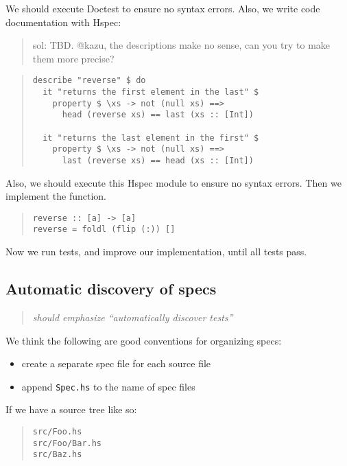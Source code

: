 \documentclass[preprint]{sigplanconf}
\begin{document}
\noindent We should execute Doctest to ensure no syntax errors.
Also, we write code documentation with Hspec:

\begin{quote}
    sol: TBD. @kazu, the descriptions make no sense, can you try to
    make them more precise?
\end{quote}

\begin{quote}
\small
\begin{verbatim}
describe "reverse" $ do
  it "returns the first element in the last" $
    property $ \xs -> not (null xs) ==>
      head (reverse xs) == last (xs :: [Int])

  it "returns the last element in the first" $
    property $ \xs -> not (null xs) ==>
      last (reverse xs) == head (xs :: [Int])
\end{verbatim}
\end{quote}

\noindent Also, we should execute this Hspec module
to ensure no syntax errors.
Then we implement the function.

\begin{quote}
\small
\begin{verbatim}
reverse :: [a] -> [a]
reverse = foldl (flip (:)) []
\end{verbatim}
\end{quote}

\noindent Now we run tests, and improve our implementation, until all
tests pass.

\subsection{Automatic discovery of specs}

\begin{quote}
    \emph{should emphasize ``automatically discover tests''}
\end{quote}


\noindent We think the following are good conventions for organizing specs:
\begin{itemize}
    \item create a separate spec file for each source file
    \item append {\tt Spec.hs} to the name of spec files
\end{itemize}

\noindent If we have a source tree like so:

\begin{quote}
\small
\begin{verbatim}
src/Foo.hs
src/Foo/Bar.hs
src/Baz.hs
\end{verbatim}
\end{quote}
\end{document}
